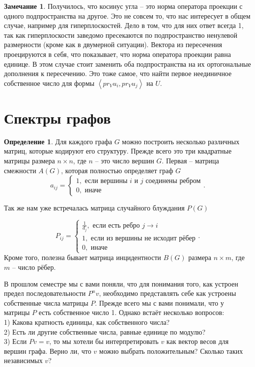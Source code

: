 \documentclass[10pt,a4paper,oneside]{book}
\theoremstyle{definition}
\newtheorem*{rem}{Замечание}
\newtheorem*{defn}{{\color{yellow!30!red} Определение}}
\def\lan{\left\langle }
\def\ran{\right\rangle}
\def\dfn{\begin{defn}}
\def\edfn{\end{defn}}
\def\rm{\begin{rem}}
\def\erm{\end{rem}}
\begin{document}
\rm Получилось, что косинус угла -- это норма оператора проекции с одного подпространства на другое. Это не совсем то, что нас интересует в общем случае, например для гиперплоскостей. Дело в том, что для них ответ всегда 1, так как гиперплоскости заведомо пресекаются по подпространство ненулевой размерности (кроме как в двумерной ситуации). Вектора из пересечения проецируются в себя, что показывает, что норма оператора проекции равна единице. В этом случае стоит заменить оба подпространства на их ортогональные дополнения к пересечению. Это тоже самое, что найти первое неединичное собственное число для формы  $\lan pr_V u_i, pr_V u_j\ran$ на $U$.
\erm




\section{Спектры графов}

\dfn
Для каждого графа $G$ можно построить  несколько  различных матриц, которые кодируют его структуру. Прежде всего это три квадратные матрицы  размера $n\times n$, где $n$ -- это число вершин $G$. 
Первая -- матрица смежности  $A(G)$, которая полностью определяет граф $G$
$$a_{ij}=\begin{cases} 1, \text{ если вершины $i$ и $j$ соединены ребром}\\
0, \text{ иначе }
\end{cases}.$$

Так же нам уже встречалась матрица случайного блуждания  $P(G)$

$$P_{ij}=\begin{cases}
\frac{1}{d_j}, \text{ если есть ребро $j\to i$}\\
1, \text{ если из вершины не исходит рёбер} \\
0, \text{ иначе }
\end{cases}.$$
Кроме того, полезна бывает матрица инцидентности $B(G)$ размера $n\times m$, где $m$ -- число рёбер.
\edfn

В прошлом семестре мы с вами поняли, что для понимания того, как устроен предел последовательности $P^nv$, необходимо представлять себе как устроены собственные числа матрицы $P$. Прежде всего мы с вами понимали, что у матрицы $P$ есть собственное число 1. Однако встаёт несколько вопросов:\\
1) Какова кратность единицы, как собственного числа?\\
2) Есть ли другие собственные числа, равные единице по модулю?\\
3) Если $Pv=v$, то мы хотели бы интерпретировать $v$ как вектор весов для вершин графа. Верно ли, что $v$ можно выбрать положительным? Сколько таких независимых $v$?
\end{document}
